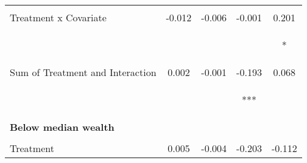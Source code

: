 \begin{tabular}{lcccc}
 & \begin{footnotesize}[0.016]\end{footnotesize} & \begin{footnotesize}[0.008]\end{footnotesize} & \begin{footnotesize}[0.119]\end{footnotesize} & \begin{footnotesize}[0.101]\end{footnotesize}\\
\noalign{\smallskip}Treatment x Covariate & -0.012 & -0.006 & -0.001 & 0.201\\
 & \begin{footnotesize}[0.017]\end{footnotesize} & \begin{footnotesize}[0.009]\end{footnotesize} & \begin{footnotesize}[0.107]\end{footnotesize} & \begin{footnotesize}[0.109]*\end{footnotesize}\\
\noalign{\smallskip}Sum of Treatment and Interaction & 0.002 & -0.001 & -0.193 & 0.068\\
 & \begin{footnotesize}[0.013]\end{footnotesize} & \begin{footnotesize}[0.007]\end{footnotesize} & \begin{footnotesize}[0.071]***\end{footnotesize} & \begin{footnotesize}[0.069]\end{footnotesize}\\
\noalign{\smallskip}\textbf{Below median wealth} &  &  &  & \\
 & \begin{footnotesize}\end{footnotesize} & \begin{footnotesize}\end{footnotesize} & \begin{footnotesize}\end{footnotesize} & \begin{footnotesize}\end{footnotesize}\\
\noalign{\smallskip}Treatment & 0.005 & -0.004 & -0.203 & -0.112\\

\end{tabular}
